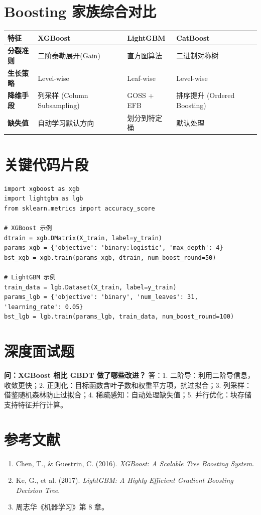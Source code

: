 \documentclass[12pt, a4paper]{book}
\begin{document}
\section{Boosting 家族综合对比}
\begin{table}[h]
\centering
\begin{tabularx}{\textwidth}{|l|X|X|X|}
\hline
\textbf{特征} & \textbf{XGBoost} & \textbf{LightGBM} & \textbf{CatBoost} \\
\hline
\textbf{分裂准则} & 二阶泰勒展开(Gain) & 直方图算法 & 二进制对称树 \\
\hline
\textbf{生长策略} & Level-wise & Leaf-wise & Level-wise \\
\hline
\textbf{降维手段} & 列采样 (Column Subsampling) & GOSS + EFB & 排序提升 (Ordered Boosting) \\
\hline
\textbf{缺失值} & 自动学习默认方向 & 划分到特定桶 & 默认处理 \\
\hline
\end{tabularx}
\end{table}

\section{关键代码片段}
\begin{lstlisting}
import xgboost as xgb
import lightgbm as lgb
from sklearn.metrics import accuracy_score

# XGBoost 示例
dtrain = xgb.DMatrix(X_train, label=y_train)
params_xgb = {'objective': 'binary:logistic', 'max_depth': 4}
bst_xgb = xgb.train(params_xgb, dtrain, num_boost_round=50)

# LightGBM 示例
train_data = lgb.Dataset(X_train, label=y_train)
params_lgb = {'objective': 'binary', 'num_leaves': 31, 'learning_rate': 0.05}
bst_lgb = lgb.train(params_lgb, train_data, num_boost_round=100)
\end{lstlisting}

\section{深度面试题}
\textbf{问：XGBoost 相比 GBDT 做了哪些改进？}
答：1. 二阶导：利用二阶导信息，收敛更快；2. 正则化：目标函数含叶子数和权重平方项，抗过拟合；3. 列采样：借鉴随机森林防止过拟合；4. 稀疏感知：自动处理缺失值；5. 并行优化：块存储支持特征并行计算。

\section{参考文献}
\begin{enumerate}
    \item Chen, T., & Guestrin, C. (2016). \textit{XGBoost: A Scalable Tree Boosting System}.
    \item Ke, G., et al. (2017). \textit{LightGBM: A Highly Efficient Gradient Boosting Decision Tree}.
    \item 周志华《机器学习》第 8 章。
\end{enumerate}
\end{document}
